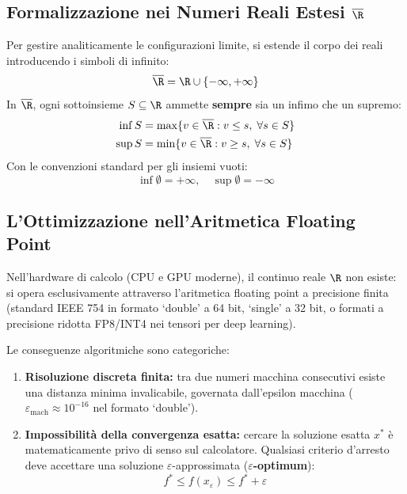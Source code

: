\subsection[Formalizzazione nei Numeri Reali Estesi]{Formalizzazione nei Numeri Reali Estesi $\overline{\R}$}
Per gestire analiticamente le configurazioni limite, si estende il corpo dei reali introducendo i simboli di infinito:
\begin{equation}
\overline{\R} = \R \cup \{-\infty, +\infty\}
\end{equation}
In $\overline{\R}$, ogni sottoinsieme $S \subseteq \R$ ammette \textbf{sempre} sia un infimo che un supremo:
\begin{align}
\inf S &= \max \{ v \in \overline{\R} : v \le s, \; \forall s \in S \} \\
\sup S &= \min \{ v \in \overline{\R} : v \ge s, \; \forall s \in S \}
\end{align}
Con le convenzioni standard per gli insiemi vuoti:
\begin{equation}
\inf \emptyset = +\infty, \quad \sup \emptyset = -\infty
\end{equation}

\subsection{L'Ottimizzazione nell'Aritmetica Floating Point}
Nell'hardware di calcolo (CPU e GPU moderne), il continuo reale $\R$ non esiste: si opera esclusivamente attraverso l'aritmetica floating point a precisione finita (standard IEEE 754 in formato `double' a 64 bit, `single' a 32 bit, o formati a precisione ridotta FP8/INT4 nei tensori per deep learning).

Le conseguenze algoritmiche sono categoriche:
\begin{enumerate}
    \item \textbf{Risoluzione discreta finita:} tra due numeri macchina consecutivi esiste una distanza minima invalicabile, governata dall'epsilon macchina ($\varepsilon_{\text{mach}} \approx 10^{-16}$ nel formato `double').
    \item \textbf{Impossibilit\`a della convergenza esatta:} cercare la soluzione esatta $x^*$ \`e matematicamente privo di senso sul calcolatore. Qualsiasi criterio d'arresto deve accettare una soluzione $\varepsilon$-approssimata (\textbf{$\varepsilon$-optimum}):
    \begin{equation}
    f^* \le f(x_\varepsilon) \le f^* + \varepsilon
    \end{equation}
\end{enumerate}

